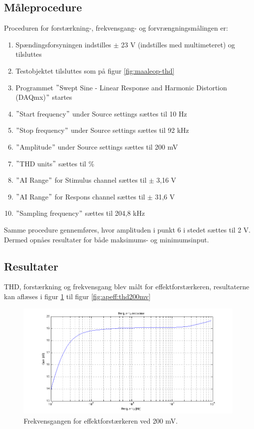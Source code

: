 \subsection*{Måleprocedure}
Proceduren for forstærkning-, frekvensgang- og forvrængningsmålingen er:

\begin{enumerate}
\item Spændingsforsyningen indstilles $\pm$ 23 V (indstilles med multimeteret) og tilsluttes
\item Testobjektet tilsluttes som på figur \ref{fig:maaleop-thd}
\item Programmet $"$Swept Sine - Linear Response and Harmonic Distortion (DAQmx)$"$ startes
\item $"$Start frequency$"$ under Source settings sættes til 10 Hz
\item $"$Stop frequency$"$ under Source settings sættes til 92 kHz
\item $"$Amplitude$"$ under Source settings sættes til 200 mV
\item $"$THD units$"$ sættes til \%
\item $"$AI Range$"$ for Stimulus channel sættes til $\pm$ 3,16 V
\item $"$AI Range$"$ for Respons channel sættes til $\pm$ 31,6 V
\item $"$Sampling frequency$"$ sættes til 204,8 kHz
\end{enumerate}

Samme procedure gennemføres, hvor amplituden i punkt 6 i stedet sættes til 2 V. Dermed opnåes resultater for både maksimums- og minimumsinput. 


\subsection*{Resultater}
THD, forstærkning og frekvensgang blev målt for effektforstærkeren, resultaterne kan aflæses i figur \ref{fig:apeff:frek200mv} til figur \ref{fig:apeff:thd200mv} 

\begin{figure}[h]
\centering
\includegraphics[width=\textwidth]{maalerapporter/effektforstaerker/200mV-45mA-uden-modstand-frek.png}
\caption{Frekvensgangen for effektforstærkeren ved 200 mV.}
\label{fig:apeff:frek200mv}
\end{figure}

